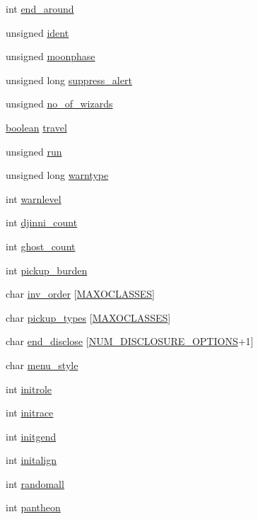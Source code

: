 \begin{DoxyCompactItemize}
\item 
int \hyperlink{structflag_ad980590820b88f01125262991dc438be}{end\+\_\+around}
\item 
unsigned \hyperlink{structflag_ab942b8e32836e4e1bc725d7715bacd68}{ident}
\item 
unsigned \hyperlink{structflag_a238ee0e647aca6e3eb9b3fc8cc4f1de5}{moonphase}
\item 
unsigned long \hyperlink{structflag_ab558d0d3ed4a3952a137452df27c7c64}{suppress\+\_\+alert}
\item 
unsigned \hyperlink{structflag_a234ec46fbb73d319d628aa1cc320be8b}{no\+\_\+of\+\_\+wizards}
\item 
\hyperlink{global_8h_a531b10dd351aa162d7dcccd1966308b8}{boolean} \hyperlink{structflag_abe72b39197f5cbc611db8c44e477ccbc}{travel}
\item 
unsigned \hyperlink{structflag_a75d9c7e384cce1696f2c2d1b2881d162}{run}
\item 
unsigned long \hyperlink{structflag_a8dd0a7f691a4ce435bdce865db7a120c}{warntype}
\item 
int \hyperlink{structflag_ac1920376d9c18e4f6a1ab4441a5835f8}{warnlevel}
\item 
int \hyperlink{structflag_a49bc19dacb9cf8ae7e97cf22bb964e2d}{djinni\+\_\+count}
\item 
int \hyperlink{structflag_a7c8d492cee8daf2733b18954793990e3}{ghost\+\_\+count}
\item 
int \hyperlink{structflag_aa9b137c717124f991e9db76dea705a7d}{pickup\+\_\+burden}
\item 
char \hyperlink{structflag_afbbdabb7b1593b8ff0036a5c67ece86f}{inv\+\_\+order} \mbox{[}\hyperlink{objclass_8h_af51133138bfb718b55aaa7f29711a10a}{M\+A\+X\+O\+C\+L\+A\+S\+S\+E\+S}\mbox{]}
\item 
char \hyperlink{structflag_a9f5bdc61a0cc269e6631f79e19fced46}{pickup\+\_\+types} \mbox{[}\hyperlink{objclass_8h_af51133138bfb718b55aaa7f29711a10a}{M\+A\+X\+O\+C\+L\+A\+S\+S\+E\+S}\mbox{]}
\item 
char \hyperlink{structflag_ac299d5bda237844a96be2caf62346d60}{end\+\_\+disclose} \mbox{[}\hyperlink{flag_8h_a9d87bc8e08c67c315bd721f30186bbfc}{N\+U\+M\+\_\+\+D\+I\+S\+C\+L\+O\+S\+U\+R\+E\+\_\+\+O\+P\+T\+I\+O\+N\+S}+1\mbox{]}
\item 
char \hyperlink{structflag_a4c7aac17ec6b0121796b28803d94547c}{menu\+\_\+style}
\item 
int \hyperlink{structflag_a3b31f41da5faa08ea53d1e7ddf857088}{initrole}
\item 
int \hyperlink{structflag_a4c946d68b3e8e39311a0d20be0027a26}{initrace}
\item 
int \hyperlink{structflag_ad3655bdc9c8984f4d3c4944a7a72795a}{initgend}
\item 
int \hyperlink{structflag_a66f0ee2707e5a565a25f948658362ced}{initalign}
\item 
int \hyperlink{structflag_a06854edfd7c6649ef7381c7ca1865f85}{randomall}
\item 
int \hyperlink{structflag_a845a1767e4894171f7364a6122a0e09c}{pantheon}
\end{DoxyCompactItemize}


